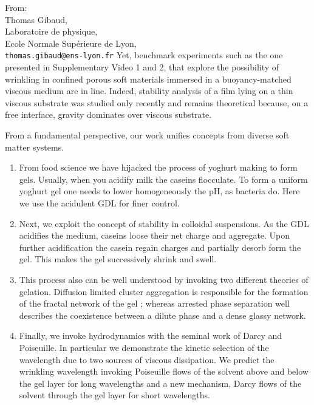 \documentclass[a4paper, parskip=true, firsthead=false, fromemail=true, foldmarks=false]{scrlttr2}
\begin{document}
\begin{letter}{From:\\
Thomas Gibaud,\\
Laboratoire de physique,\\
Ecole Normale Supérieure de Lyon,\\
\texttt{thomas.gibaud@ens-lyon.fr}
}
Yet, benchmark experiments such as the one presented in Supplementary Video 1 and 2, that explore the possibility of wrinkling in confined porous soft materials immersed in a buoyancy-matched viscous medium are in line. Indeed, stability analysis of a film lying on a thin viscous substrate was studied only recently and remains theoretical because, on a free interface, gravity dominates over viscous substrate.

From a fundamental perspective, our work unifies concepts from diverse soft matter systems.
\begin{enumerate}
\item From food science we have hijacked the process of yoghurt making to form gels. Usually, when you acidify milk the caseins flocculate. To form a uniform yoghurt gel one needs to lower homogeneously the pH, as bacteria do. Here we use the acidulent GDL for finer control.

\item  Next, we exploit the concept of stability in colloidal suspensions. As the GDL acidifies the medium, caseins loose their net charge and aggregate. Upon further acidification the casein regain charges and partially desorb form the gel. This makes the gel successively shrink and swell.

\item This process also can be well understood by invoking two different theories of gelation. Diffusion limited cluster aggregation is responsible for the formation of the fractal network of the gel ; whereas arrested phase separation well describes the coexistence between a dilute phase and a dense glassy network.

\item Finally, we invoke hydrodynamics with the seminal work of Darcy and Poiseuille. In particular we demonstrate the kinetic selection of the wavelength due to two sources of viscous dissipation. We predict the wrinkling wavelength invoking Poiseuille flows of the solvent above and below the gel layer for long wavelengths and a new mechanism, Darcy flows of the solvent through the gel layer for short wavelengths.
\end{enumerate}




\end{letter}
\end{document}
